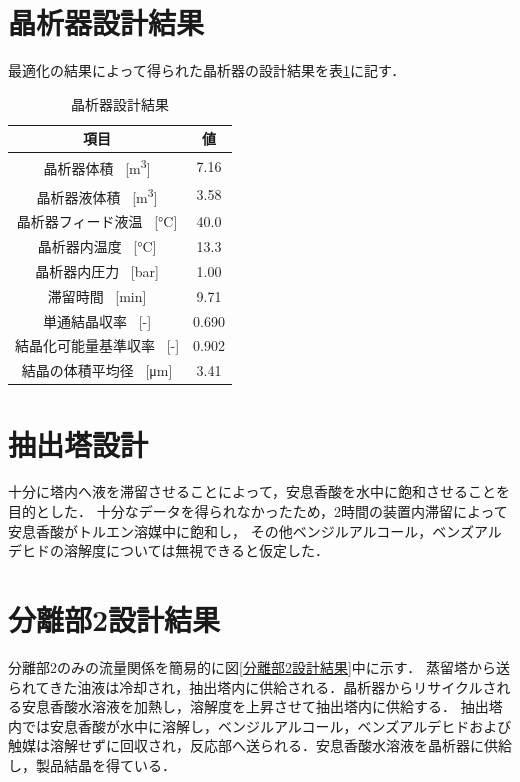 \documentclass[a4j]{jsreport}
\begin{document}
\section{晶析器設計結果}
最適化の結果によって得られた晶析器の設計結果を表\ref{晶析器設計結果}に記す．
\clearpage
\begin{table}[htbp]
  \centering
  \caption{晶析器設計結果}
  \label{晶析器設計結果}
  \begin{tabular}{cc}
    \hline
    項目 & 値 \\
    \hline
    晶析器体積 \, [\si{\cubic \metre}] &7.16 \\
    晶析器液体積 \, [\si{\cubic \metre}] &3.58 \\
    晶析器フィード液温 \, [\si{\degreeCelsius}] & 40.0 \\
    晶析器内温度 \, [\si{\degreeCelsius}] &13.3 \\
    晶析器内圧力 \, [\si{bar}] &1.00 \\
    滞留時間 \, [\si{min}] &9.71 \\
    単通結晶収率 \, [\si{-}] &0.690 \\
    結晶化可能量基準収率 \, [\si{-}] &0.902 \\
    結晶の体積平均径 \, [\si{\micro \metre}] &3.41 \\
    \hline
  \end{tabular}
\end{table}

\section{抽出塔設計}
十分に塔内へ液を滞留させることによって，安息香酸を水中に飽和させることを目的とした．
十分なデータを得られなかったため，2時間の装置内滞留によって安息香酸がトルエン溶媒中に飽和し，
その他ベンジルアルコール，ベンズアルデヒドの溶解度については無視できると仮定した．

\section{分離部2設計結果}
分離部2のみの流量関係を簡易的に図\ref{分離部2設計結果}中に示す．
蒸留塔から送られてきた油液は冷却され，抽出塔内に供給される．晶析器からリサイクルされる安息香酸水溶液を加熱し，溶解度を上昇させて抽出塔内に供給する．
抽出塔内では安息香酸が水中に溶解し，ベンジルアルコール，ベンズアルデヒドおよび触媒は溶解せずに回収され，反応部へ送られる．安息香酸水溶液を晶析器に供給し，製品結晶を得ている．
\end{document}
